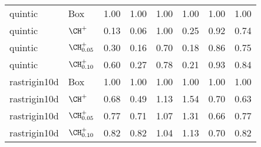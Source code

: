 \begin{table}[ht]
\begin{tabular}{llllllll}
  quintic & {\sc Box} & 1.00 & 1.00 & 1.00 & 1.00 & 1.00 & 1.00 \\ 
  quintic & $\CH^+$ & 0.13 & 0.06 & 1.00 & 0.25 & 0.92 & 0.74 \\ 
  quintic & $\CH^+_{0.05}$ & 0.30 & 0.16 & 0.70 & 0.18 & 0.86 & 0.75 \\ 
  quintic & $\CH^+_{0.10}$ & 0.60 & 0.27 & 0.78 & 0.21 & 0.93 & 0.84 \\ 
  rastrigin10d & {\sc Box} & 1.00 & 1.00 & 1.00 & 1.00 & 1.00 & 1.00 \\ 
  rastrigin10d & $\CH^+$ & 0.68 & 0.49 & 1.13 & 1.54 & 0.70 & 0.63 \\ 
  rastrigin10d & $\CH^+_{0.05}$ & 0.77 & 0.71 & 1.07 & 1.31 & 0.66 & 0.77 \\ 
  rastrigin10d & $\CH^+_{0.10}$ & 0.82 & 0.82 & 1.04 & 1.13 & 0.70 & 0.82 \\ 
   \hline
\end{tabular}
\end{table}
